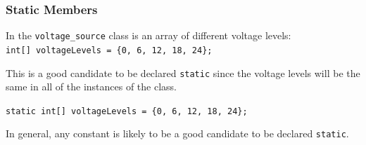 \begin{frame}
\frametitle{Static Members}

In the \texttt{voltage\_source} class is an array of different voltage levels:\\
\quad \texttt{int[] voltageLevels = \{0, 6, 12, 18, 24\};}

This is a good candidate to be declared \texttt{static} since the voltage levels will be the same in all of the instances of the class.

\texttt{static int[] voltageLevels = \{0, 6, 12, 18, 24\};}

In general, any constant is likely to be a good candidate to be declared \texttt{static}.

\end{frame}




